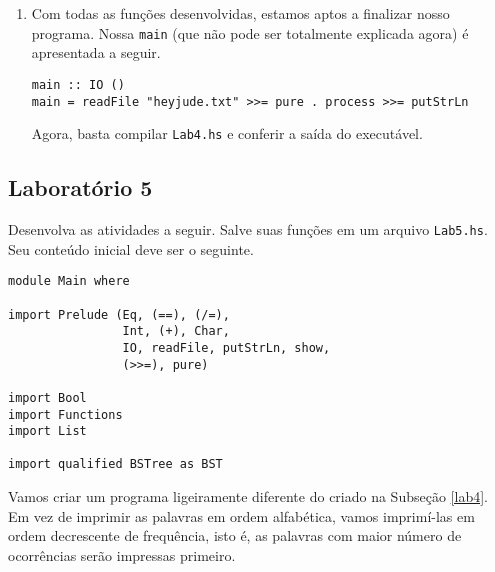 \documentclass[a4paper]{article}
\begin{document}
\begin{enumerate}
		\begin{verbatim}
process :: [Char] -> [Char]
process = makeOutput . countWords . clean where
	clean = undefined
	countWords = undefined
	makeOutput = concat . intercalate "\n" . map f . BST.inOrder
	f (str, c) = str ++ ": " ++ show c
		\end{verbatim}
		Escreva implementações para \texttt{clean} e \texttt{countWords}.
		A função \texttt{clean} deve remover os caracteres \texttt{','}, \texttt{'('}, \texttt{')'}, \texttt{'?'} e \texttt{'!'}, e isso pode ser feito com uma composição de \texttt{remove}s.
		A função \texttt{countWords} deve construir a árvore com a contagem de ocorrência das palavras, e isso pode ser expresso como uma composição das funções \texttt{lines}, \texttt{words}, \texttt{map}, \texttt{concat} e \texttt{count}.
	\item
		Com todas as funções desenvolvidas, estamos aptos a finalizar nosso programa.
		Nossa \texttt{main} (que não pode ser totalmente explicada agora) é apresentada a seguir.
		\begin{verbatim}
main :: IO ()
main = readFile "heyjude.txt" >>= pure . process >>= putStrLn
		\end{verbatim}
		Agora, basta compilar \texttt{Lab4.hs} e conferir a saída do executável.
\end{enumerate}

\subsection{Laboratório 5}

Desenvolva as atividades a seguir.
Salve suas funções em um arquivo \texttt{Lab5.hs}.
Seu conteúdo inicial deve ser o seguinte.

\pagebreak

\begin{verbatim}
module Main where

import Prelude (Eq, (==), (/=),
                Int, (+), Char,
                IO, readFile, putStrLn, show,
                (>>=), pure)

import Bool
import Functions
import List

import qualified BSTree as BST
\end{verbatim}

Vamos criar um programa ligeiramente diferente do criado na Subseção \ref{lab4}.
Em vez de imprimir as palavras em ordem alfabética, vamos imprimí-las em ordem decrescente de frequência, isto é, as palavras com maior número de ocorrências serão impressas primeiro.
\end{document}
